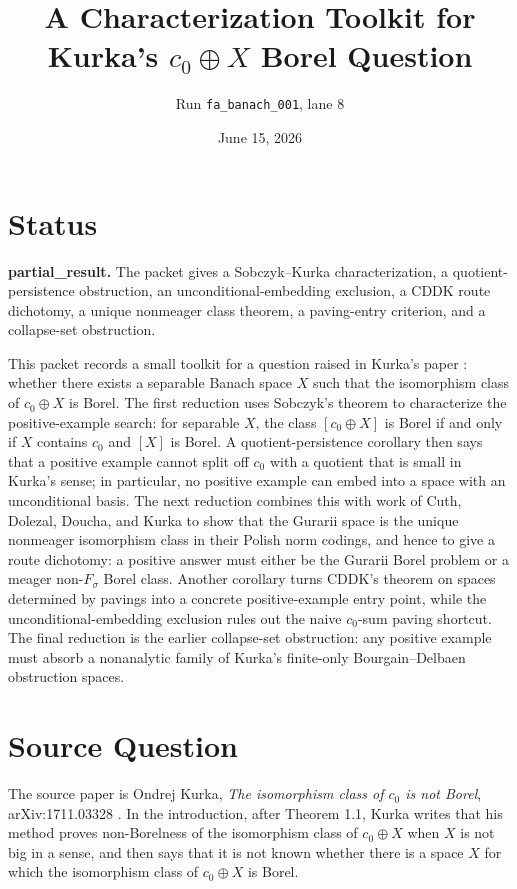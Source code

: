 \documentclass[11pt]{article}
\title{A Characterization Toolkit for Kurka's \(c_0\oplus X\) Borel Question}
\author{Run \texttt{fa\_banach\_001}, lane 8}
\date{June 15, 2026}
\begin{document}
\maketitle

\section*{Status}

\textbf{partial\_result.} The packet gives a Sobczyk--Kurka characterization,
a quotient-persistence obstruction, an unconditional-embedding exclusion, a
CDDK route dichotomy, a unique nonmeager class theorem, a paving-entry
criterion, and a collapse-set obstruction.

This packet records a small toolkit for a question raised in Kurka's paper \cite{Kurka}: whether there exists a separable Banach space \(X\) such that the isomorphism class of \(c_0\oplus X\) is Borel.  The first reduction uses Sobczyk's theorem to characterize the positive-example search: for separable \(X\), the class \([c_0\oplus X]\) is Borel if and only if \(X\) contains \(c_0\) and \([X]\) is Borel.  A quotient-persistence corollary then says that a positive example cannot split off \(c_0\) with a quotient that is small in Kurka's sense; in particular, no positive example can embed into a space with an unconditional basis.  The next reduction combines this with work of Cuth, Dolezal, Doucha, and Kurka to show that the Gurarii space is the unique nonmeager isomorphism class in their Polish norm codings, and hence to give a route dichotomy: a positive answer must either be the Gurarii Borel problem or a meager non-\(F_\sigma\) Borel class.  Another corollary turns CDDK's theorem on spaces determined by pavings into a concrete positive-example entry point, while the unconditional-embedding exclusion rules out the naive \(c_0\)-sum paving shortcut.  The final reduction is the earlier collapse-set obstruction: any positive example must absorb a nonanalytic family of Kurka's finite-only Bourgain--Delbaen obstruction spaces.

\section*{Source Question}

The source paper is Ondrej Kurka, \emph{The isomorphism class of \(c_0\) is not Borel}, arXiv:1711.03328 \cite{Kurka}.  In the introduction, after Theorem 1.1, Kurka writes that his method proves non-Borelness of the isomorphism class of \(c_0\oplus X\) when \(X\) is not big in a sense, and then says that it is not known whether there is a space \(X\) for which the isomorphism class of \(c_0\oplus X\) is Borel.
\end{document}
